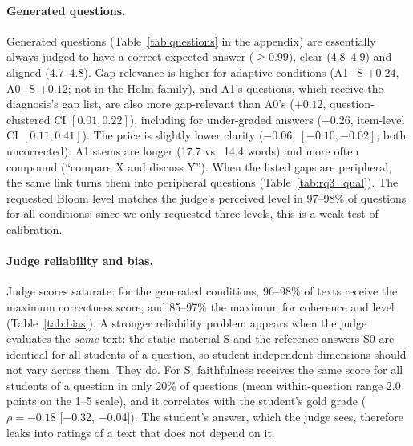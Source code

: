 \documentclass[11pt]{article}
\begin{document}
\paragraph{Generated questions.} Generated questions (Table~\ref{tab:questions} in the appendix) are essentially always judged to have a correct expected answer ($\ge 0.99$), clear (4.8--4.9) and aligned (4.7--4.8). Gap relevance is higher for adaptive conditions (A1$-$S $+0.24$, A0$-$S $+0.12$; not in the Holm family), and A1's questions, which receive the diagnosis's gap list, are also more gap-relevant than A0's ($+0.12$, question-clustered CI $[0.01, 0.22]$), including for under-graded answers ($+0.26$, item-level CI $[0.11, 0.41]$). The price is slightly lower clarity ($-0.06$, $[-0.10, -0.02]$; both uncorrected): A1 stems are longer (17.7 vs.\ 14.4 words) and more often compound (``compare X and discuss Y''). When the listed gaps are peripheral, the same link turns them into peripheral questions (Table~\ref{tab:rq3_qual}). The requested Bloom level matches the judge's perceived level in 97--98\% of questions for all conditions; since we only requested three levels, this is a weak test of calibration.

\paragraph{Judge reliability and bias.} Judge scores saturate: for the generated conditions, 96--98\% of texts receive the maximum correctness score, and 85--97\% the maximum for coherence and level (Table~\ref{tab:bias}). A stronger reliability problem appears when the judge evaluates the \emph{same} text: the static material S and the reference answers S0 are identical for all students of a question, so student-independent dimensions should not vary across them. They do. For S, faithfulness receives the same score for all students of a question in only 20\% of questions (mean within-question range 2.0 points on the 1--5 scale), and it correlates with the student's gold grade ($\rho=-0.18$ [$-$0.32, $-$0.04]). The student's answer, which the judge sees, therefore leaks into ratings of a text that does not depend on it.
\end{document}
